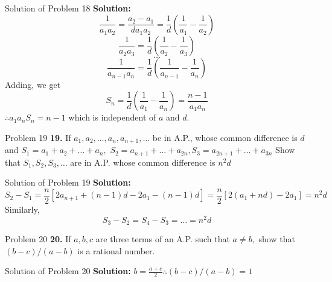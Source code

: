 \documentclass[aspectratio=1610,8pt]{beamer}
\begin{document}
\begin{frame}{Solution of Problem 18}
  \textbf{Solution:} $$\frac{1}{a_1a_2} = \frac{a_2 - a_1}{da_1a_2} = \frac{1}{d}\left(\frac{1}{a_1} - \frac{1}{a_2}\right)$$
  $$\frac{1}{a_2a_3} = \frac{1}{d}\left(\frac{1}{a_2} - \frac{1}{a_3}\right)$$
  $$\ldots$$
  $$\frac{1}{a_{n - 1}a_n} = \frac{1}{d}\left(\frac{1}{a_{n - 1}} - \frac{1}{a_n}\right)$$
  Adding, we get
  $$S_n = \frac{1}{d}\left(\frac{1}{a_1} - \frac{1}{a_n}\right) = \frac{n - 1}{a_1a_n}$$
  $\therefore a_1a_nS_n = n - 1$ which is independent of $a$ and $d.$
\end{frame}
\begin{frame}{Problem 19}
  \textbf{19.} If $a_1, a_2, \ldots, a_n, a_{n + 1}, \ldots$ be in A.P., whose common difference is $d$ and $S_1 = a_1 + a_2 +
  \ldots + a_n,$ $S_2 = a_{n + 1} + \ldots + a_{2n}, S_3 = a_{2n + 1} + \ldots + a_{3n}$ Show that $S_1, S_2, S_3, \ldots$ are in
  A.P. whose common difference is $n^2d$
\end{frame}
\begin{frame}{Solution of Problem 19}
  \textbf{Solution:}$$S_2 - S_1 = \frac{n}{2}[2a_{n + 1} + (n - 1)d - 2a_1 - (n - 1)d] = \frac{n}{2}[2(a_1 + nd) - 2a_1] = n^2d$$
  Similarly, $$S_3 - S_2 = S_4 - S_3 = \ldots = n^2d$$
\end{frame}
\begin{frame}{Problem 20}
  \textbf{20.} If $a, b, c$ are three terms of an A.P. such that $a\neq b,$ show that $(b - c)/(a - b)$ is a rational number.
\end{frame}
\begin{frame}{Solution of Problem 20}
  \textbf{Solution:} $b = \frac{a + c}{2}\therefore (b - c)/(a - b) = 1$
\end{frame}
\end{document}
